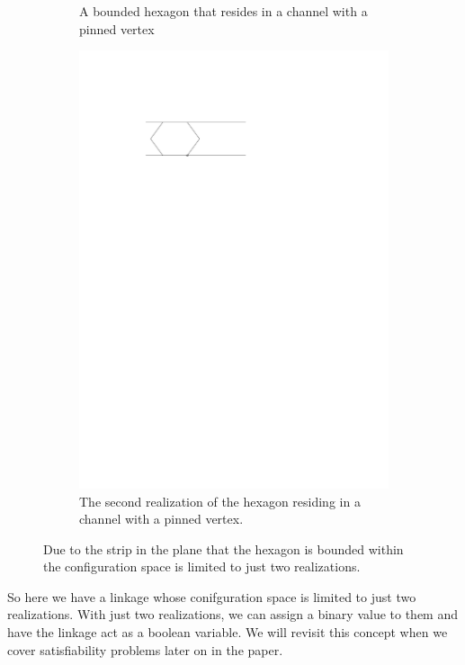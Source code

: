 \begin{figure}[!ht]
\begin{center}
\begin{subfigure}[b]{0.49\textwidth}
	  \caption{A bounded hexagon that resides in a channel with a pinned vertex}
	  \label{fig:linkage-1-1}
  \end{subfigure}
  \begin{subfigure}[b]{0.49\textwidth}
	  \includegraphics[width=\textwidth]{graphics/hexagonInChannelWithPinnedJointLeft.pdf}
	  \caption{The second realization of the hexagon residing in a channel with a pinned vertex.}
	  \label{fig:linkage-1-2}
  \end{subfigure}
\end{center} 
\caption{Due to the strip in the plane that the hexagon is bounded within the configuration space is limited to just two realizations.}\label{fig:linkage-1}
\end{figure}
So here we have a linkage whose conifguration space is limited to just two realizations.  With just two realizations, we can assign a binary value to them and have the linkage act as a boolean variable.  We will revisit this concept when we cover satisfiability problems later on in the paper.
